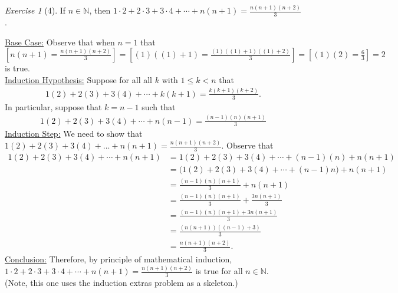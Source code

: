 \documentclass[12pt]{amsart}
\makeatletter
\theoremstyle{remark}
\newtheorem*{exercise}{Exercise}%
\def\NN{\ensuremath{\mathbb N}}
\renewenvironment{proof}[1][\proofname]{\par\doublespacing
  \pushQED{\qed}%
  \normalfont \topsep6\p@\@plus6\p@\relax
  \list{}{%
    \settowidth{\leftmargin}{\itshape\proofname:\hskip\labelsep}%
    \setlength{\labelwidth}{0pt}%
    \setlength{\itemindent}{-\leftmargin}%
  }%
  \item[\hskip\labelsep\itshape#1\@addpunct{:}]\ignorespaces
}{%
  \popQED\endlist\@endpefalse
  \singlespacing
}
\theoremstyle{mycomment}
\makeatother
\begin{document}
\break
\begin{exercise}[4] If $n\in\NN$, then $1\cdot 2+2\cdot 3+3\cdot 4+\cdots+n(n+1)=\frac{n(n+1)(n+2)}{3}$.
\begin{proof}%
  \underline{Base Case:} Observe that when $n = 1$ that $\left[n(n+1) = \frac{n(n+1)(n+2)}{3}\right] = \left[(1)((1)+ 1) = \frac{(1)((1)+1)((1) + 2)}{3}\right] = \left[(1)(2) = \frac{6}{3} \right] = 2$ is true. \\
  \underline{Induction Hypothesis:} Suppose for all all $k$ with $1 \leq k < n$ that
  \begin{align*}
    1(2) + 2(3) + 3(4) + \cdots + k(k+1) = \frac{k(k+1)(k+2)}{3}.
  \end{align*}
  In particular, suppose that $k = n-1$ such that
  \begin{align*}
    1(2) + 2(3) + 3(4) + \cdots + n(n-1) = \frac{(n-1)(n)(n+1)}{3}
  \end{align*}
  \underline{Induction Step:} We need to show that $1(2) + 2(3) + 3(4)+...+ n(n+1) = \frac{n(n+1)(n+2)}{3}$.  Observe that
  \begin{align*}
    1(2) + 2(3) + 3(4) + \cdots + n(n+1) &= 1(2) + 2(3) + 3(4) + \cdots + (n-1)(n) + n(n+1) \\
                                         &= \biggl(1(2) + 2(3) + 3(4) + \cdots + (n-1)n\biggr) + n(n+1) \\
                                         &= \frac{(n-1)(n)(n+1)}{3} + n(n+1) \\
                                         &= \frac{(n-1)(n)(n+1)}{3} + \frac{3n(n+1)}{3} \\
                                         &= \frac{(n-1)(n)(n+1) + 3n(n+1)}{3} \\
                                         &= \frac{(n(n+1))((n-1)+3)}{3} \\
                                         &= \frac{n(n+1)(n+2)}{3}.
  \end{align*}
\underline{Conclusion:} Therefore, by principle of mathematical induction, $1\cdot 2+2\cdot 3+3\cdot 4+\cdots+n(n+1)=\frac{n(n+1)(n+2)}{3}$ is true for all $n \in \NN$.\\
(Note, this one uses the induction extras problem as a skeleton.)
\end{proof}
\end{exercise}
\break
\end{document}
